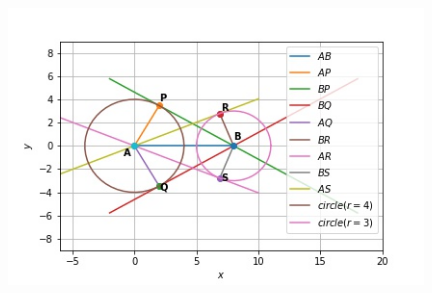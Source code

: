 \documentclass[journal,12pt,twocolumn]{IEEEtran}
\begin{document}
\begin{figure}
    \includegraphics[width=11cm]{Assignment3.jpg}
    \label{plot1}
\end{figure}
\end{document}
